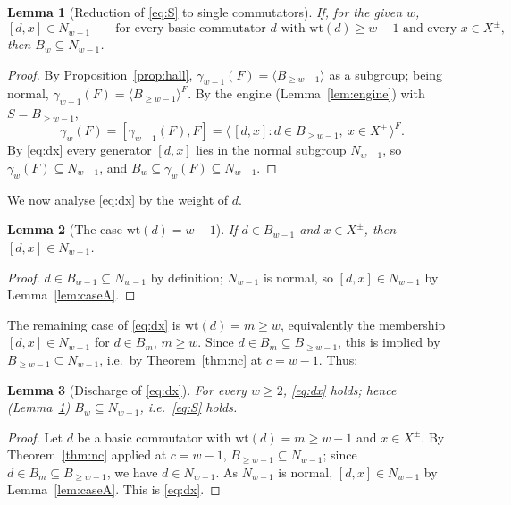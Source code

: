 \documentclass{amsart}
\newtheorem{lemma}{Lemma}
\theoremstyle{definition}
\theoremstyle{remark}
\begin{document}
\begin{lemma}[Reduction of \eqref{eq:S} to single commutators]\label{lem:S-to-engine}
If, for the given $w$,
\begin{equation}\label{eq:dx}
[d,x]\in N_{w-1}\qquad\text{for every basic commutator $d$ with $\mathrm{wt}(d)\ge w-1$ and every $x\in X^{\pm}$,}
\end{equation}
then $B_w\subseteq N_{w-1}$.
\end{lemma}
\begin{proof}
By Proposition~\ref{prop:hall}, $\gamma_{w-1}(F)=\langle B_{\ge w-1}\rangle$ as a
subgroup; being normal, $\gamma_{w-1}(F)=\langle B_{\ge w-1}\rangle^{F}$. By the
engine (Lemma~\ref{lem:engine}) with $S=B_{\ge w-1}$,
\[
\gamma_w(F)=[\gamma_{w-1}(F),F]=\big\langle\,[d,x] : d\in B_{\ge w-1},\ x\in
X^{\pm}\,\big\rangle^{F}.
\]
By \eqref{eq:dx} every generator $[d,x]$ lies in the normal subgroup $N_{w-1}$, so
$\gamma_w(F)\subseteq N_{w-1}$, and $B_w\subseteq\gamma_w(F)\subseteq N_{w-1}$.
\end{proof}

We now analyse \eqref{eq:dx} by the weight of $d$.

\begin{lemma}[The case $\mathrm{wt}(d)=w-1$]\label{lem:dw1}
If $d\in B_{w-1}$ and $x\in X^{\pm}$, then $[d,x]\in N_{w-1}$.
\end{lemma}
\begin{proof}
$d\in B_{w-1}\subseteq N_{w-1}$ by definition; $N_{w-1}$ is normal, so
$[d,x]\in N_{w-1}$ by Lemma~\ref{lem:caseA}.
\end{proof}

The remaining case of \eqref{eq:dx} is $\mathrm{wt}(d)=m\ge w$, equivalently the
membership $[d,x]\in N_{w-1}$ for $d\in B_m$, $m\ge w$. Since $d\in B_m\subseteq
B_{\ge w-1}$, this is implied by $B_{\ge w-1}\subseteq N_{w-1}$, i.e.\ by
Theorem~\ref{thm:nc} at $c=w-1$. Thus:

\begin{lemma}[Discharge of \eqref{eq:dx}]\label{lem:hardcase}
For every $w\ge2$, \eqref{eq:dx} holds; hence (Lemma~\ref{lem:S-to-engine})
$B_w\subseteq N_{w-1}$, i.e.\ \eqref{eq:S} holds.
\end{lemma}
\begin{proof}
Let $d$ be a basic commutator with $\mathrm{wt}(d)=m\ge w-1$ and $x\in X^{\pm}$. By
Theorem~\ref{thm:nc} applied at $c=w-1$, $B_{\ge w-1}\subseteq N_{w-1}$; since
$d\in B_m\subseteq B_{\ge w-1}$, we have $d\in N_{w-1}$. As $N_{w-1}$ is normal,
$[d,x]\in N_{w-1}$ by Lemma~\ref{lem:caseA}. This is \eqref{eq:dx}.
\end{proof}
\end{document}
